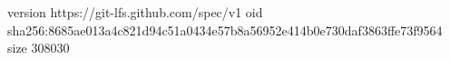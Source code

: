 version https://git-lfs.github.com/spec/v1
oid sha256:8685ae013a4c821d94c51a0434e57b8a56952e414b0e730daf3863ffe73f9564
size 308030
